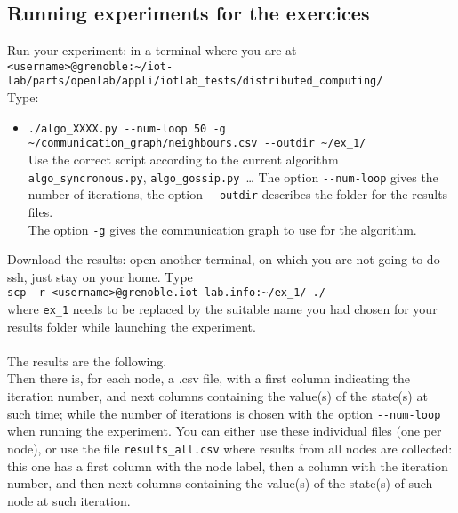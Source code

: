 \documentclass{article}
\begin{document}
\subsection{Running experiments for the exercices}

Run your experiment: in a terminal where you are at \\
\verb=<username>@grenoble:~/iot-lab/parts/openlab/appli/iotlab_tests/distributed_computing/= \\
Type:
\begin{itemize}
	\item \verb=./algo_XXXX.py --num-loop 50 -g ~/communication_graph/neighbours.csv --outdir ~/ex_1/= \\
    Use the correct script according to the current algorithm \verb=algo_syncronous.py=, \verb=algo_gossip.py=~\dots
	The option \verb=--num-loop= gives the number of iterations, the option \verb=--outdir= describes the folder for the results files.\\
	The option \verb=-g= gives the communication graph to use for the algorithm.\\
	\end{itemize}

Download the results: open another terminal, on which you are not going to do ssh, just stay on your home. Type \\
         \verb=scp -r <username>@grenoble.iot-lab.info:~/ex_1/ ./=\\
where \verb=ex_1=  needs to be replaced by the suitable name you had chosen for your results folder while launching the experiment.

\paragraph{}The results are the following. \\
Then there is, for each node, a .csv file, with a first column indicating the
iteration number, and next columns containing the value(s) of the state(s) at
such time;
while the number of iterations is chosen with the option \verb=--num-loop= when
running the experiment.
You can either use these individual files (one per node), or use the file
\verb=results_all.csv= where results from all nodes are collected:
this one has a first column with the node label, then a column with the iteration number,
and then next columns containing the value(s) of the state(s) of such node at such iteration.
\end{document}
